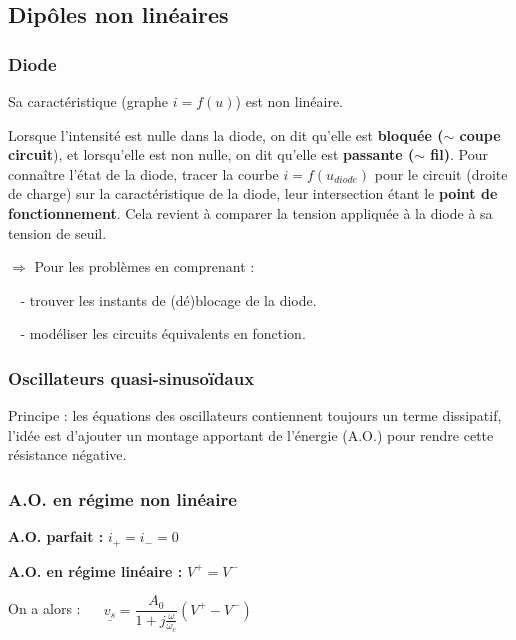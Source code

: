 \documentclass[9pt,twocolumn]{article}
\begin{document}
\setlength{\columnseprule}{0.1pt}
\begin{center}
\part*{Dipôles non linéaires}
\end{center}
\section{Diode}

Sa caractéristique (graphe $i=f(u)$) est non linéaire.

Lorsque l'intensité est nulle dans la diode, on dit qu'elle est \textbf{bloquée ($\sim$ coupe circuit}), et lorsqu'elle est non nulle, on dit qu'elle est \textbf{passante ($\sim$ fil)}.
\medbreak
Pour connaître l'état de la diode, tracer la courbe $i=f(u_{diode})$ pour le circuit (droite de charge) sur la caractéristique de la diode, leur intersection étant le \textbf{point de fonctionnement}.
\smallbreak
Cela revient à comparer la tension appliquée à la diode à sa tension de seuil.

\medbreak 

$\Rightarrow$ Pour les problèmes en comprenant : 

$\>\>\>\>$- trouver les instants de (dé)blocage de la diode.

$\>\>\>\>$- modéliser les circuits équivalents en fonction.



\section{Oscillateurs quasi-sinusoïdaux}

Principe : les équations des oscillateurs contiennent toujours un terme dissipatif, l'idée est d'ajouter un montage apportant de l'énergie (A.O.) pour rendre cette résistance négative.



\section{A.O. en régime non linéaire}

\textbf{A.O. parfait :} $\boxed{i_+=i_-=0}$

\textbf{A.O. en régime linéaire :} $\boxed{V^+=V^-}$

\medbreak

On a alors : $\>\>\>\>\>\>\boxed{\underline{v_s}=\dfrac{A_0}{1+j\frac{\omega}{\omega_c}} (V^+-V^-)}\>\>\>$
\end{document}
